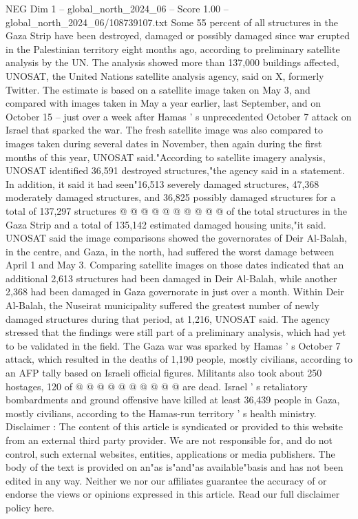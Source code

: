 \begin{textsample}{NEG Dim 1 – global\_north\_2024\_06 – Score 1.00 – global\_north\_2024\_06/108739107.txt}  \label{ex:f1_neg_146}
Some 55 percent of all structures in the Gaza Strip have been destroyed, damaged or possibly damaged since war erupted in the Palestinian territory eight months ago, according to preliminary satellite analysis by the UN.
The analysis showed more than 137,000 buildings affected, UNOSAT, the United Nations satellite analysis agency, said on X, formerly Twitter.
The estimate is based on a satellite image taken on May 3, and compared with images taken in May a year earlier, last September, and on October 15 -- just over a week after Hamas ' s unprecedented October 7 attack on Israel that sparked the war.
The fresh satellite image was also compared to images taken during several dates in November, then again during the first months of this year, UNOSAT said."According to satellite imagery analysis, UNOSAT identified 36,591 destroyed structures,"the agency said in a statement.
In addition, it said it had seen"16,513 severely damaged structures, 47,368 moderately damaged structures, and 36,825 possibly damaged structures for a total of 137,297 structures @ @ @ @ @ @ @ @ @ @ of the total structures in the Gaza Strip and a total of 135,142 estimated damaged housing units,"it said.
UNOSAT said the image comparisons showed the governorates of Deir Al-Balah, in the centre, and Gaza, in the north, had suffered the worst damage between April 1 and May 3.
Comparing satellite images on those dates indicated that an additional 2,613 structures had been damaged in Deir Al-Balah, while another 2,368 had been damaged in Gaza governorate in just over a month.
Within Deir Al-Balah, the Nuseirat municipality suffered the greatest number of newly damaged structures during that period, at 1,216, UNOSAT said.
The agency stressed that the findings were still part of a preliminary analysis, which had yet to be validated in the field.
The Gaza war was sparked by Hamas ' s October 7 attack, which resulted in the deaths of 1,190 people, mostly civilians, according to an AFP tally based on Israeli official figures.
Militants also took about 250 hostages, 120 of @ @ @ @ @ @ @ @ @ @ are dead.
Israel ' s retaliatory bombardments and ground offensive have killed at least 36,439 people in Gaza, mostly civilians, according to the Hamas-run territory ' s health ministry.
Disclaimer : The content of this article is syndicated or provided to this website from an external third party provider.
We are not responsible for, and do not control, such external websites, entities, applications or media publishers.
The body of the text is provided on an"as is"and"as available"basis and has not been edited in any way.
Neither we nor our affiliates guarantee the accuracy of or endorse the views or opinions expressed in this article.
Read our full disclaimer policy here.

\end{textsample}
